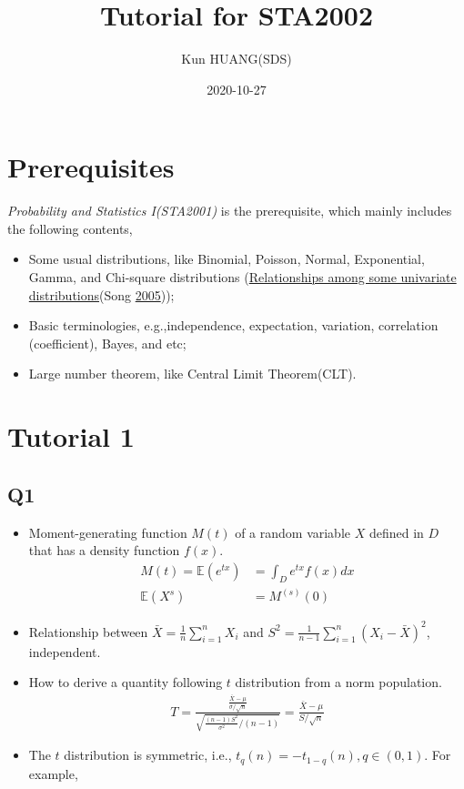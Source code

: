 \documentclass[
]{book}
\title{Tutorial for STA2002}
\author{Kun HUANG(SDS)}
\date{2020-10-27}
\theoremstyle{definition}
\theoremstyle{definition}
\theoremstyle{definition}
\theoremstyle{remark}
\begin{document}
\maketitle

{
\setcounter{tocdepth}{1}
\tableofcontents
}
\hypertarget{prerequisites}{%
\chapter*{Prerequisites}\label{prerequisites}}

\emph{Probability and Statistics I(STA2001)} is the prerequisite, which mainly includes the following contents,

\begin{itemize}
\item
  Some usual distributions, like Binomial, Poisson, Normal, Exponential, Gamma, and Chi-square distributions (\href{https://www.tandfonline.com/doi/pdf/10.1080/07408170590948512?needAccess=true}{Relationships among some univariate
  distributions}(Song \protect\hyperlink{ref-song2005relationships}{2005}));
\item
  Basic terminologies, e.g.,independence, expectation, variation, correlation (coefficient), Bayes, and etc;
\item
  Large number theorem, like Central Limit Theorem(CLT).
\end{itemize}

\hypertarget{sec:T1}{%
\chapter{Tutorial 1}\label{sec:T1}}

\hypertarget{q1}{%
\section{Q1}\label{q1}}

\begin{itemize}
\item
  Moment-generating function \(M(t)\) of a random variable \(X\) defined in \(D\) that has a density function \(f(x)\).
  \begin{align}
  M(t) = \mathbb{E}(e^{tx}) &= \int_{D} e^{tx}f(x)dx\\
  \mathbb{E}(X^{s}) &= M^{(s)}(0)
  \end{align}
\item
  Relationship between \(\bar X=\frac{1}{n}\sum\limits_{i=1}^n X_i\) and \(S^2=\frac{1}{n-1}\sum\limits_{i=1}^n(X_i-\bar X)^2\), independent.
\item
  How to derive a quantity following \(t\) distribution from a norm population.
  \begin{align}
  T=\frac{\frac{\bar{X}-\mu}{\sigma / \sqrt{n}}}{\sqrt{\frac{(n-1) S^{2}}{\sigma^{2}} /(n-1)}}=\frac{\bar{X}-\mu}{S / \sqrt{n}}
  \end{align}
\item
  The \(t\) distribution is symmetric, i.e., \(t_{q}(n) = -t_{1-q}(n), q\in(0,1)\). For example,
\end{itemize}
\end{document}
